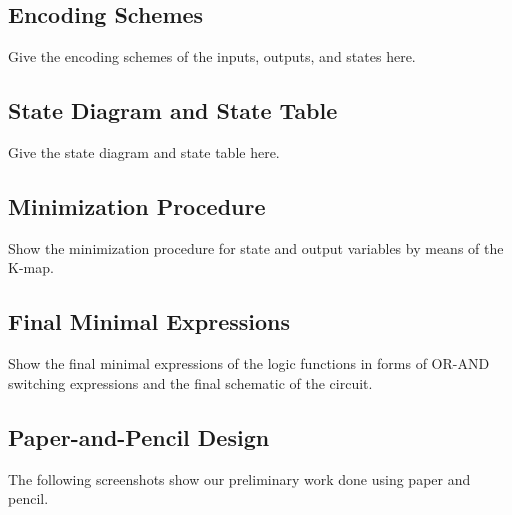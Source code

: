 \documentclass{article}
\begin{document}
\subsection{Encoding Schemes}
Give the encoding schemes of the inputs, outputs, and states here.


\subsection{State Diagram and State Table}
Give the state diagram and state table here.


\subsection{Minimization Procedure}
Show the minimization procedure for state and output variables by means of the 
K-map.


\subsection{Final Minimal Expressions}
Show the final minimal expressions of the logic functions in forms of OR-AND 
switching expressions and the final schematic of the circuit.


\subsection{Paper-and-Pencil Design}
The following screenshots show our preliminary work done using paper and 
pencil.

\end{document}
